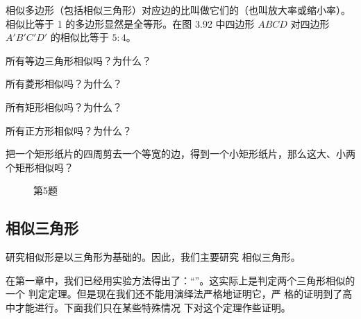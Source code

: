 \begin{Definition} 
相似多边形（包括相似三角形）对应边的比叫做它们的（也叫放大率或缩小率）。相似比等于 1 的多边形显然是全等形。在图 3.92 中四边形 $ABCD$ 对四边形 $A'B'C'D'$ 的相似比等于 $5:4$。
\end{Definition}

\begin{Practice}
\begin{question}
  \item 所有等边三角形相似吗？为什么？
  \item 所有菱形相似吗？为什么？
  \item 所有矩形相似吗？为什么？
  \item 所有正方形相似吗？为什么？
  \item 把一个矩形纸片的四周剪去一个等宽的边，得到一个小矩形纸片，那么这大、小两个矩形相似吗？
\end{question}
\end{Practice}

\begin{figure}
    \centering
{}
    \caption*{第5题}
\end{figure}

\subsection{相似三角形}
研究相似形是以三角形为基础的。因此，我们主要研究
相似三角形。

在第一章中，我们已经用实验方法得出了：“”。这实际上是判定两个三角形相似的一个
判定定理。但是现在我们还不能用演绎法严格地证明它，严
格的证明到了高中才能进行。下面我们只在某些特殊情况
下对这个定理作些证明。

